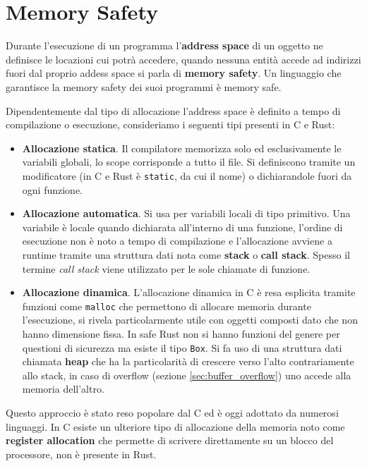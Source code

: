 \documentclass[Lau,binding=0.6cm]{sapthesis}
\newcommand{\textcode}[1]{\colorbox{backcolour}{\texttt{#1}}}
\begin{document}
\chapter{Memory Safety} \label{chap:memory_safety}

Durante l'esecuzione di un programma l'\textbf{address space} di un oggetto ne definisce le locazioni cui potrà accedere, quando nessuna entità accede ad indirizzi fuori dal proprio addess space si parla di \textbf{memory safety}. 
Un linguaggio che garantisce la memory safety dei suoi programmi è memory safe.

Dipendentemente dal tipo di allocazione l'address space è definito a tempo di compilazione o esecuzione, consideriamo i seguenti tipi presenti in C e Rust:

\begin{itemize}
	\item \textbf{Allocazione statica}. Il compilatore memorizza solo ed esclusivamente le variabili globali, lo scope corrisponde a tutto il file.
		Si definiscono tramite un modificatore (in C e Rust è \textcode{static}, da cui il nome) o dichiarandole fuori da ogni funzione.  
    	\item \textbf{Allocazione automatica}. Si usa per variabili locali di tipo primitivo. Una variabile è locale quando dichiarata all'interno di una funzione, l'ordine di esecuzione non è noto a tempo di compilazione e l'allocazione avviene a runtime tramite una struttura dati nota come \textbf{stack} o \textbf{call stack}. 
		Spesso il termine \textit{call stack} viene utilizzato per le sole chiamate di funzione. 
    	\item \textbf{Allocazione dinamica}. L'allocazione dinamica in C è resa esplicita tramite funzioni come \textcode{malloc} che permettono di allocare memoria durante l'esecuzione, si rivela particolarmente utile con oggetti composti dato che non hanno dimensione fissa. 
    		In safe Rust non si hanno funzioni del genere per questioni di sicurezza ma esiste il tipo \textcode{Box}.
		Si fa uso di una struttura dati chiamata \textbf{heap} che ha la particolarità di crescere verso l'alto contrariamente allo stack, in caso di overflow (sezione \ref{sec:buffer_overflow}) uno accede alla memoria dell'altro. 
\end{itemize}

Questo approccio è stato reso popolare dal C ed è oggi adottato da numerosi linguaggi.
In C esiste un ulteriore tipo di allocazione della memoria noto come \textbf{register allocation} che permette di scrivere direttamente su un blocco del processore, non è presente in Rust.
\end{document}
